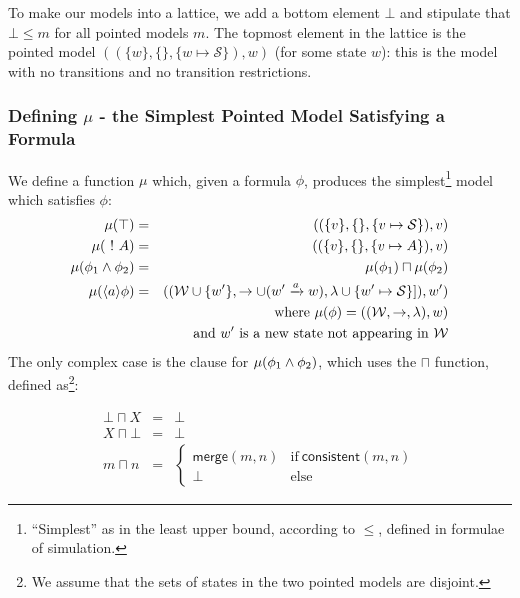 To make our models into a lattice, we add a bottom element $\bot$ and stipulate that $\bot \leq m$ for all pointed models $m$.
The topmost element in the lattice is the pointed model $( (\{w\}, \{\}, \{w \mapsto \mathcal{S}\}), w)$ (for some state $w$): this is the model with no transitions and no transition restrictions.

\subsubsection{Defining $\mu$ - the Simplest Pointed Model Satisfying a Formula}
We define a function $\mu$ which, given a formula $\phi$, produces the simplest\footnote{``Simplest'' as in the least upper bound, according to $\leq$, defined in formulae of simulation.} model which satisfies $\phi$:
\begin{eqnarray}
\mu (\top) & = & ( (\{v\}, \{\}, \{v \mapsto \mathcal{S}\}), v) \nonumber \\
\mu (\ ! \  A) & = & ( (\{v\}, \{\}, \{v \mapsto A\}), v) \nonumber \\
\mu (\phi_1 \land \phi_2) & = & \mu(\phi_1) \sqcap \mu(\phi_2) \nonumber \\
\mu (\langle a \rangle \phi) & = & ( (\mathcal{W} \cup \{w'\}, \rightarrow \cup (w' \xrightarrow{a} w), \lambda \cup \{w' \mapsto \mathcal{S}\}]), w') \nonumber \\
		& & \mbox{where }\mu(\phi) = ( (\mathcal{W}, \rightarrow, \lambda), w) \nonumber \\
		& & \mbox{and }w' \mbox{ is a new state not appearing in }\mathcal{W} \nonumber
\end{eqnarray}
The only complex case is the clause for $\mu (\phi_1 \land \phi_2)$, which uses the $\sqcap$ function, defined as\footnote{We assume that the sets of states in the two pointed models are disjoint.}:

\begin{eqnarray*}
  \bot \sqcap X 
     & = & 
  \bot \nonumber 
     \\
  X \sqcap \bot 
     & = & 
  \bot \nonumber 
     \\
  m \sqcap n 
     & = & 
  \begin{cases}
    \mathsf{merge}(m, n) & \text{if}\ \mathsf{consistent}(m, n) \\
    \bot & \text{else}
  \end{cases}
\end{eqnarray*}

